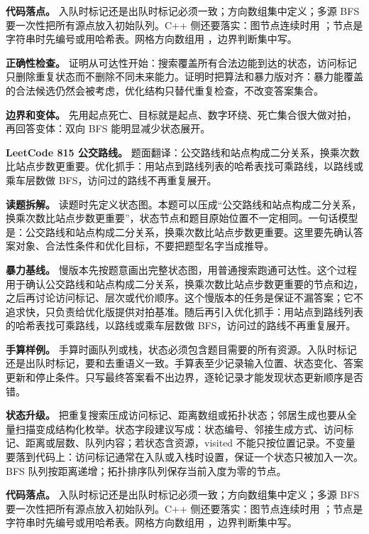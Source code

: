 \textbf{代码落点。} 入队时标记还是出队时标记必须一致；方向数组集中定义；多源 BFS 要一次性把所有源点放入初始队列。C++ 侧还要落实：图节点连续时用 ；节点是字符串时先编号或用哈希表。网格方向数组用 ，边界判断集中写。

\textbf{正确性检查。} 证明从可达性开始：搜索覆盖所有合法边能到达的状态，访问标记只删除重复状态而不删除不同未来能力。证明时把算法和暴力版对齐：暴力能覆盖的合法候选仍然会被考虑，优化结构只替代重复检查，不改变答案集合。

\textbf{边界和变体。} 先用起点死亡、目标就是起点、数字环绕、死亡集合很大做对拍，再回答变体：双向 BFS 能明显减少状态展开。

\noindent\textbf{LeetCode 815 公交路线。} 题面翻译：公交路线和站点构成二分关系，换乘次数比站点步数更重要。优化抓手：用站点到路线列表的哈希表找可乘路线，以路线或乘车层数做 BFS，访问过的路线不再重复展开。

\textbf{读题拆解。} 读题时先定义状态图。本题可以压成“公交路线和站点构成二分关系，换乘次数比站点步数更重要”，状态节点和题目原始位置不一定相同。一句话模型是：公交路线和站点构成二分关系，换乘次数比站点步数更重要。这里要先确认答案对象、合法性条件和优化目标，不要把题型名字当成推导。

\textbf{暴力基线。} 慢版本先按题意画出完整状态图，用普通搜索跑通可达性。这个过程用于确认公交路线和站点构成二分关系，换乘次数比站点步数更重要的节点和边，之后再讨论访问标记、层次或代价顺序。这个慢版本的任务是保证不漏答案；它不追求快，只负责给优化版提供对拍基准。随后再引入优化抓手：用站点到路线列表的哈希表找可乘路线，以路线或乘车层数做 BFS，访问过的路线不再重复展开。

\textbf{手算样例。} 手算时画队列或栈，状态必须包含题目需要的所有资源。入队时标记还是出队时标记，要和去重语义一致。手算表至少记录输入位置、状态变化、答案更新和停止条件。只写最终答案看不出边界，逐轮记录才能发现状态更新顺序是否错。

\textbf{状态升级。} 把重复搜索压成访问标记、距离数组或拓扑状态；邻居生成也要从全量扫描变成结构化枚举。状态字段建议写成：状态编号、邻接生成方式、访问标记、距离或层数、队列内容；若状态含资源，visited 不能只按位置记录。不变量要落到代码上：访问标记通常在入队或入栈时设置，保证一个状态只被加入一次。BFS 队列按距离递增；拓扑排序队列保存当前入度为零的节点。

\textbf{代码落点。} 入队时标记还是出队时标记必须一致；方向数组集中定义；多源 BFS 要一次性把所有源点放入初始队列。C++ 侧还要落实：图节点连续时用 ；节点是字符串时先编号或用哈希表。网格方向数组用 ，边界判断集中写。

